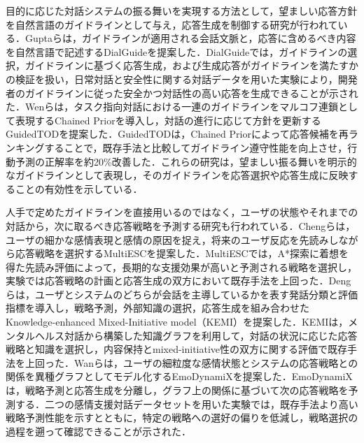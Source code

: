\documentclass[manuscript,review,anonymous]{acmart}
\begin{document}
目的に応じた対話システムの振る舞いを実現する方法として，望ましい応答方針を自然言語のガイドラインとして与え，応答生成を制御する研究が行われている．Guptaらは，ガイドラインが適用される会話文脈と，応答に含めるべき内容を自然言語で記述するDialGuideを提案した\cite{gupta2023dialguide}．DialGuideでは，ガイドラインの選択，ガイドラインに基づく応答生成，および生成応答がガイドラインを満たすかの検証を扱い，日常対話と安全性に関する対話データを用いた実験により，開発者のガイドラインに従った安全かつ対話性の高い応答を生成できることが示された．Wenらは，タスク指向対話における一連のガイドラインをマルコフ連鎖として表現するChained Priorを導入し，対話の進行に応じて方針を更新するGuidedTODを提案した\cite{wen2025guidedtod}．GuidedTODは，Chained Priorによって応答候補を再ランキングすることで，既存手法と比較してガイドライン遵守性能を向上させ，行動予測の正解率を約20\%改善した．これらの研究は，望ましい振る舞いを明示的なガイドラインとして表現し，そのガイドラインを応答選択や応答生成に反映することの有効性を示している．

人手で定めたガイドラインを直接用いるのではなく，ユーザの状態やそれまでの対話から，次に取るべき応答戦略を予測する研究も行われている．Chengらは，ユーザの細かな感情表現と感情の原因を捉え，将来のユーザ反応を先読みしながら応答戦略を選択するMultiESCを提案した\cite{cheng2022multiesc}．MultiESCでは，A*探索に着想を得た先読み評価によって，長期的な支援効果が高いと予測される戦略を選択し，実験では応答戦略の計画と応答生成の双方において既存手法を上回った．Dengらは，ユーザとシステムのどちらが会話を主導しているかを表す発話分類と評価指標を導入し，戦略予測，外部知識の選択，応答生成を組み合わせたKnowledge-enhanced Mixed-Initiative model（KEMI）を提案した\cite{deng2023mixedinitiative}．KEMIは，メンタルヘルス対話から構築した知識グラフを利用して，対話の状況に応じた応答戦略と知識を選択し，内容保持とmixed-initiative性の双方に関する評価で既存手法を上回った．Wanらは，ユーザの細粒度な感情状態とシステムの応答戦略との関係を異種グラフとしてモデル化するEmoDynamiXを提案した\cite{wan2025emodynamix}．EmoDynamiXは，戦略予測と応答生成を分離し，グラフ上の関係に基づいて次の応答戦略を予測する．二つの感情支援対話データセットを用いた実験では，既存手法より高い戦略予測性能を示すとともに，特定の戦略への選好の偏りを低減し，戦略選択の過程を遡って確認できることが示された．
\end{document}
